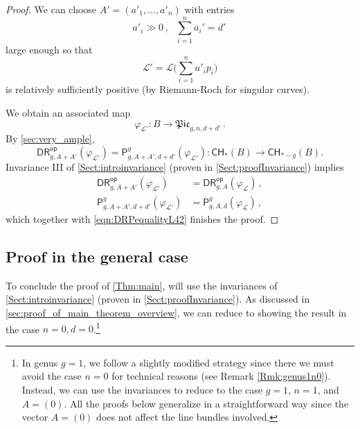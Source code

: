 \documentclass[a4paper,12pt]{article} %
\newcommand{\ca}[1]{{\mathcal{#1}}}
\def\P{\mathsf{P}}
\theoremstyle{definition}
\theoremstyle{plain}%
\renewcommand{\phi}{\varphi}
\newcommand{\Picabs}{\mathfrak{Pic}}
\newcommand{\Chow}{\mathsf{CH}}
\newcommand{\invnrA}{III}
\newcommand{\DRop}{\mathsf{DR}^{\mathsf{op}}}
\begin{document}
\begin{proof}
We can choose $A' = (a'_1,\dots, a'_n)$ with entries 
$$a'_i \gg 0\, , \ \ \ \sum_{i=1}^na_i' =d'\, $$
large enough so that $$\ca L' = \ca L\Big(\sum_{i=1}^n a'_ip_i\Big)$$
is relatively sufficiently positive (by Riemann-Roch for singular curves). 

We obtain an associated map 
$$\phi_{{\ca L}'} \colon B \to \Picabs_{g,n,d+d'}\, .$$
By \cref{sec:very_ample},
\begin{equation} \label{eqn:DRPequalityL42} \DRop_{g,A+A'}(\phi_{{\ca L}'})=
\P_{g,A+A',d+d'}^g(\phi_{{\ca L}'}) \colon \Chow_*(B) \to \Chow_{*-g}(B).
\end{equation}
Invariance \invnrA{} of \cref{Sect:introinvariance} (proven
in \cref{Sect:proofInvariance}) implies 
\begin{align*}
\DRop_{g,A+A'}(\phi_{{\ca L'}})
&=\DRop_{g,A}(\phi_{{\ca L}})\, ,\\ \P^g_{g,A+A',d+d'}(\phi_{{\ca L'}})
&=\P^g_{g,A,d}(\phi_{{\ca L}})\, ,     
\end{align*} 
which together with \eqref{eqn:DRPequalityL42} finishes the proof.
\end{proof}

\subsection{Proof in the general case}\label{sec:general_case}

To conclude the proof of \cref{Thm:main},
will use the invariances  of \cref{Sect:introinvariance}
(proven in \cref{Sect:proofInvariance}). As discussed in \cref{sec:proof_of_main_theorem_overview}, we can reduce to showing the result in the case $n=0, d=0$.\footnote{In genus $g=1$, we  follow a slightly modified strategy since there we must avoid the case $n=0$ for technical reasons (see Remark \ref{Rmk:genus1n0}). Instead, we can use the invariances to reduce to the case $g=1$, $n=1$, and $A=(0)$. All the proofs below generalize in a straightforward way since the vector $A=(0)$ does not affect the line bundles involved.}
\end{document}
